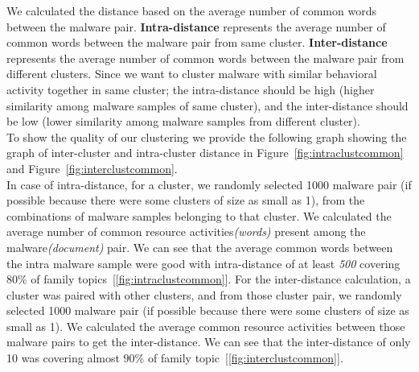 We calculated the distance based on the average number of common words between the malware pair.
\textbf{Intra-distance} represents the average number of common words between the malware pair from same cluster.
\textbf{Inter-distance} represents the average number of common words between the malware pair from different clusters.
Since we want to cluster malware with similar behavioral activity together in same cluster; the intra-distance should be high (higher similarity among malware samples of same cluster), and the inter-distance should be low (lower similarity among malware samples from different cluster).
\\

To show the quality of our clustering we provide the following graph showing the graph of inter-cluster and intra-cluster distance in Figure~\ref{fig:intraclustcommon} and Figure~\ref{fig:interclustcommon}.\\
In case of intra-distance, for a cluster, we randomly selected 1000 malware pair (if possible because there were some clusters of size as small as 1), from the combinations of malware samples belonging to that cluster.
We calculated the average number of common resource activities\textit{(words)} present among the malware\textit{(document)} pair.
We can see that the average common words between the intra malware sample were good with intra-distance of at least \emph{500} covering $80\%$ of family topics~[\autoref{fig:intraclustcommon}].
For the inter-distance calculation, a cluster was paired with other clusters, and from those cluster pair,
we randomly selected 1000 malware pair (if possible because there were some clusters of size as small as 1).
We calculated the average common resource activities between those malware pairs to get the inter-distance.
We can see that the inter-distance of only 10 was covering almost $90\%$ of family topic~[\autoref{fig:interclustcommon}].
